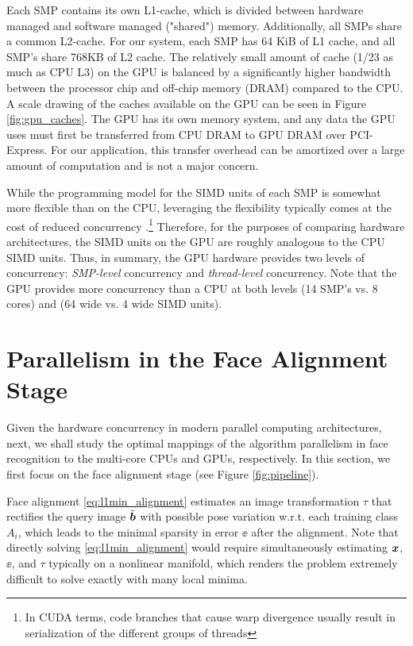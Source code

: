 \documentclass[10pt,twocolumn,letterpaper]{article}
\begin{document}
Each SMP contains its own L1-cache, which is divided between hardware managed
and software managed ("shared") memory.  Additionally, all SMPs share a common
L2-cache.  For our system, each SMP has 64 KiB of L1 cache, and all SMP's share
768KB of L2 cache. 
The relatively small amount
of cache (1/23 as much as CPU L3) on the GPU is balanced by a significantly
higher bandwidth between the processor chip and off-chip memory (DRAM) compared
to the CPU.  A scale drawing of the caches available on the GPU can be seen in Figure \ref{fig:gpu_caches}.
The GPU has its own memory system, and any data the GPU uses must first be
transferred from CPU DRAM to GPU DRAM over PCI-Express.  For our application,
this transfer overhead can be amortized over a large amount of computation and is
not a major concern.

While the programming model for
the SIMD units of each SMP is somewhat more flexible than on the CPU,
leveraging the flexibility typically comes at the cost of reduced concurrency
.\footnote{In CUDA terms, code branches that cause warp divergence usually
result in serialization of the different groups of threads}  Therefore, for
the purposes of comparing hardware architectures, the SIMD units on the GPU are
roughly analogous to the CPU SIMD units. Thus, in summary, the GPU hardware 
provides two levels of concurrency: {\em SMP-level}
concurrency and {\em thread-level} concurrency.  Note that the GPU provides more
concurrency than a CPU at both levels (14 SMP's vs. 8 cores) and (64 wide vs. 4 wide SIMD
units).

\section{Parallelism in the Face Alignment Stage}
\label{sec:alignment}

Given the hardware concurrency in modern parallel computing architectures,
next, we shall study the optimal mappings of the algorithm parallelism in face
recognition to the multi-core CPUs and GPUs, respectively.  In this section, we
first focus on the face alignment stage (see Figure \ref{fig:pipeline}).

Face alignment \eqref{eq:l1min_alignment} estimates an image transformation
$\tau$ that rectifies the query image $\tilde{{\boldsymbol{b}}}$ with possible pose
variation w.r.t. each training class $A_i$, which leads to the minimal sparsity
in error $\ee$ after the alignment. Note that directly solving
\eqref{eq:l1min_alignment} would require simultaneously estimating ${\boldsymbol{x}}$,
$\ee$, and $\tau$ typically on a nonlinear manifold, which renders the problem
extremely difficult to solve exactly with many local minima.
\end{document}
